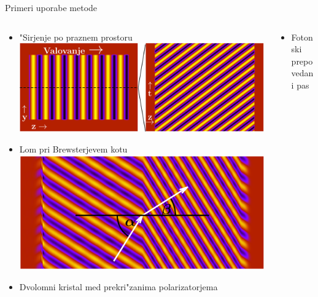 \documentclass{beamer}
\begin{document}
\begin{frame}{Primeri uporabe metode}
\begin{columns}[c]

\begin{column}[T]{.46\textwidth}
\begin{itemize}[<+->]
 \item "Sirjenje po praznem prostoru
 \includegraphics[width=.6\textwidth]{./Slike/empty}
 
 \item Lom pri Brewsterjevem kotu
 \includegraphics[width=.6\textwidth]{./Slike/refraction}
 
 
  \item Dvolomni kristal med prekri"zanima polarizatorjema\\
  \resizebox{.65\textwidth}{!}{}

\end{itemize}

\end{column}

\begin{column}[T]{.5\textwidth}
\begin{itemize}[<+->]
 \item Fotonski prepovedani pas
 \begin{center}
   \resizebox{.7\textwidth}{!}{\footnotesize } \\
    \hspace{-1cm}  \;	
  \resizebox{.6\textwidth}{!}{}
  \end{center}
  

\end{itemize}
\end{column}
\end{columns}
\end{frame}
\end{document}
